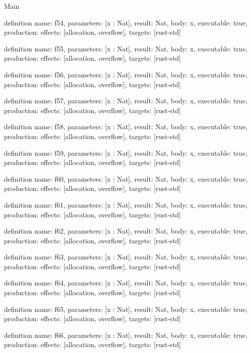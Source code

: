 \begin{lexlean}{Main}
\begin{semanticmodule}
definition{
  name: f54,
  parameters: [x : Nat],
  result: Nat,
  body: x,
  executable: true,
  production: {effects: [allocation, overflow], targets: [rust-std]}
}

definition{
  name: f55,
  parameters: [x : Nat],
  result: Nat,
  body: x,
  executable: true,
  production: {effects: [allocation, overflow], targets: [rust-std]}
}

definition{
  name: f56,
  parameters: [x : Nat],
  result: Nat,
  body: x,
  executable: true,
  production: {effects: [allocation, overflow], targets: [rust-std]}
}

definition{
  name: f57,
  parameters: [x : Nat],
  result: Nat,
  body: x,
  executable: true,
  production: {effects: [allocation, overflow], targets: [rust-std]}
}

definition{
  name: f58,
  parameters: [x : Nat],
  result: Nat,
  body: x,
  executable: true,
  production: {effects: [allocation, overflow], targets: [rust-std]}
}

definition{
  name: f59,
  parameters: [x : Nat],
  result: Nat,
  body: x,
  executable: true,
  production: {effects: [allocation, overflow], targets: [rust-std]}
}

definition{
  name: f60,
  parameters: [x : Nat],
  result: Nat,
  body: x,
  executable: true,
  production: {effects: [allocation, overflow], targets: [rust-std]}
}

definition{
  name: f61,
  parameters: [x : Nat],
  result: Nat,
  body: x,
  executable: true,
  production: {effects: [allocation, overflow], targets: [rust-std]}
}

definition{
  name: f62,
  parameters: [x : Nat],
  result: Nat,
  body: x,
  executable: true,
  production: {effects: [allocation, overflow], targets: [rust-std]}
}

definition{
  name: f63,
  parameters: [x : Nat],
  result: Nat,
  body: x,
  executable: true,
  production: {effects: [allocation, overflow], targets: [rust-std]}
}

definition{
  name: f64,
  parameters: [x : Nat],
  result: Nat,
  body: x,
  executable: true,
  production: {effects: [allocation, overflow], targets: [rust-std]}
}

definition{
  name: f65,
  parameters: [x : Nat],
  result: Nat,
  body: x,
  executable: true,
  production: {effects: [allocation, overflow], targets: [rust-std]}
}

definition{
  name: f66,
  parameters: [x : Nat],
  result: Nat,
  body: x,
  executable: true,
  production: {effects: [allocation, overflow], targets: [rust-std]}
}


\end{semanticmodule}
\end{lexlean}
